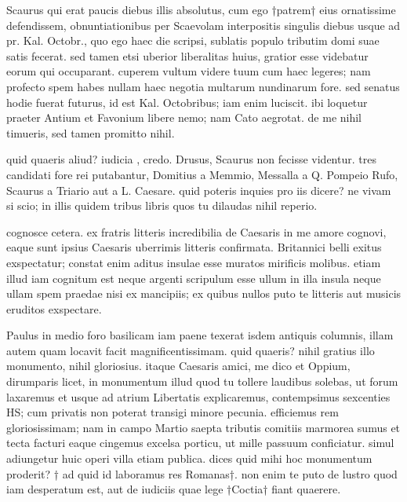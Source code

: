 Scaurus qui erat paucis diebus illis absolutus, cum ego †patrem† eius ornatissime defendissem, obnuntiationibus per Scaevolam interpositis singulis diebus usque ad pr. Kal. Octobr., quo ego haec die scripsi, sublatis populo tributim domi suae satis fecerat. sed tamen etsi uberior liberalitas huius, gratior esse videbatur eorum qui occuparant. cuperem vultum videre tuum cum haec legeres; nam profecto spem habes nullam haec negotia multarum nundinarum fore. sed senatus hodie fuerat futurus, id est Kal. Octobribus; iam enim luciscit. ibi loquetur praeter Antium et Favonium libere nemo; nam Cato aegrotat. de me nihil timueris, sed tamen promitto nihil.

 quid quaeris aliud? iudicia , credo. Drusus, Scaurus non fecisse videntur. tres candidati fore rei putabantur, Domitius a Memmio, Messalla a Q. Pompeio Rufo, Scaurus a Triario aut a L. Caesare. quid poteris inquies pro iis dicere? ne vivam si scio; in illis quidem tribus libris quos tu dilaudas nihil reperio.

 cognosce cetera. ex fratris litteris incredibilia de Caesaris in me amore cognovi, eaque sunt ipsius Caesaris uberrimis litteris confirmata. Britannici belli exitus exspectatur; constat enim aditus insulae esse muratos mirificis molibus. etiam illud iam cognitum est neque argenti scripulum esse ullum in illa insula neque ullam spem praedae nisi ex mancipiis; ex quibus nullos puto te litteris aut musicis eruditos exspectare.

 Paulus in medio foro basilicam iam paene texerat isdem antiquis columnis, illam autem quam locavit facit magnificentissimam. quid quaeris? nihil gratius illo monumento, nihil gloriosius. itaque Caesaris amici, me dico et Oppium, dirumparis licet, in monumentum illud quod tu tollere laudibus solebas, ut forum laxaremus et usque ad atrium Libertatis explicaremus, contempsimus sexcenties HS; cum privatis non poterat transigi minore pecunia. efficiemus rem gloriosissimam; nam in campo Martio saepta tributis comitiis marmorea sumus et tecta facturi eaque cingemus excelsa porticu, ut mille passuum conficiatur. simul adiungetur huic operi villa etiam publica. dices quid mihi hoc monumentum proderit? † ad quid id laboramus res Romanas†. non enim te puto de lustro quod iam desperatum est, aut de iudiciis quae lege †Coctia† fiant quaerere.
